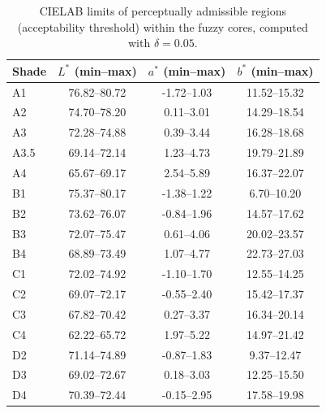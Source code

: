 \begin{table}[htbp]
\centering
\caption{CIELAB limits of perceptually admissible regions (acceptability threshold) within the fuzzy cores, computed with $\delta=0.05$.}
\begin{tabular}{lccc}
\toprule
Shade & $L^*$ (min--max) & $a^*$ (min--max) & $b^*$ (min--max) \\
\midrule
A1 & 76.82--80.72 & -1.72--1.03 & 11.52--15.32 \\
A2 & 74.70--78.20 & 0.11--3.01 & 14.29--18.54 \\
A3 & 72.28--74.88 & 0.39--3.44 & 16.28--18.68 \\
A3.5 & 69.14--72.14 & 1.23--4.73 & 19.79--21.89 \\
A4 & 65.67--69.17 & 2.54--5.89 & 16.37--22.07 \\
B1 & 75.37--80.17 & -1.38--1.22 & 6.70--10.20 \\
B2 & 73.62--76.07 & -0.84--1.96 & 14.57--17.62 \\
B3 & 72.07--75.47 & 0.61--4.06 & 20.02--23.57 \\
B4 & 68.89--73.49 & 1.07--4.77 & 22.73--27.03 \\
C1 & 72.02--74.92 & -1.10--1.70 & 12.55--14.25 \\
C2 & 69.07--72.17 & -0.55--2.40 & 15.42--17.37 \\
C3 & 67.82--70.42 & 0.27--3.37 & 16.34--20.14 \\
C4 & 62.22--65.72 & 1.97--5.22 & 14.97--21.42 \\
D2 & 71.14--74.89 & -0.87--1.83 & 9.37--12.47 \\
D3 & 69.02--72.67 & 0.18--3.03 & 12.25--15.50 \\
D4 & 70.39--72.44 & -0.15--2.95 & 17.58--19.98 \\
\bottomrule
\end{tabular}
\label{tab:core_limits_at}
\end{table}
